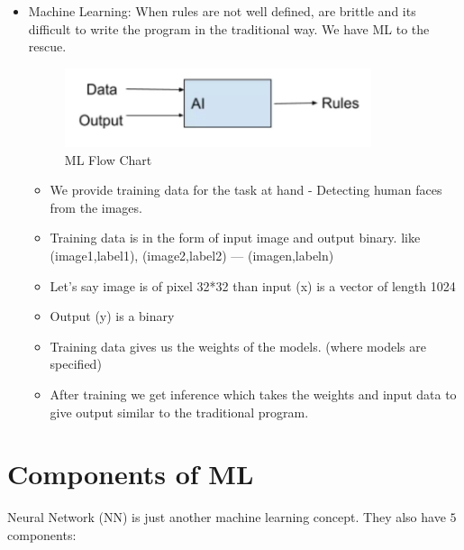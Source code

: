 \documentclass[11pt, twosides]{article}
\begin{document}
\begin{itemize}
\begin{itemize}
        \item {Machine Learning: When rules are not well defined, are brittle and its difficult to write the program in the traditional way. We have ML to the rescue.}
             \begin{figure}[htp]
    \centering
    \includegraphics[width=9cm]{ml.png}
    \caption{ML Flow Chart}
    \label{fig:galaxy}
\end{figure}
\begin{itemize}
       \item We provide training data for the task at hand - Detecting human faces from the images. 
       \item Training data is in the form of input image and output binary. like (image1,label1), (image2,label2) --- (imagen,labeln)
       \item Let's say image is of pixel 32*32 than input (x) is a vector of length 1024
       \item Output (y) is a binary 
       \item Training data gives us the weights of the models. (where models are specified)
       \item After training we get inference which takes the weights and input data to give output similar to the traditional program.
        \end{itemize}
     \end{itemize}
\end{itemize}

\section{Components of ML}

Neural Network (NN) is just another machine learning concept. They also have $5$ components:
\end{document}
